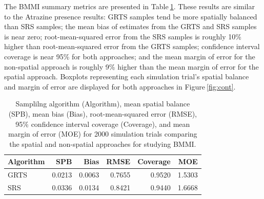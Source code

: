 \documentclass[
  shortnames]{jss}
\begin{document}
The BMMI summary metrics are presented in Table\(~\)\ref{tab:bmmi_sim}.
These results are similar to the Atrazine presence results: GRTS samples
tend be more spatially balanced than SRS samples; the mean bias of
estimates from the GRTS and SRS samples is near zero; root-mean-squared
error from the SRS samples is roughly 10\% higher than root-mean-squared
error from the GRTS samples; confidence interval coverage is near 95\%
for both approaches; and the mean margin of error for the non-spatial
approach is roughly 9\% higher than the mean margin of error for the
spatial approach. Boxplots representing each simulation trial's spatial
balance and margin of error are displayed for both approaches in
Figure\(~\)\ref{fig:cont}.

\begin{table}[t!]
\centering
\begin{tabular}{lrrrrr}
  \hline
Algorithm & SPB & Bias & RMSE & Coverage & MOE \\ 
  \hline
GRTS & 0.0213 & 0.0063 & 0.7655 & 0.9520 & 1.5303 \\ 
  SRS & 0.0336 & 0.0134 & 0.8421 & 0.9440 & 1.6668 \\ 
   \hline
\end{tabular}
\caption{Samplilng algorithm (Algorithm), mean spatial balance (SPB), mean bias (Bias), root-mean-squared error (RMSE), 95\% confidence interval coverage (Coverage), and mean margin of error (MOE) for 2000 simulation trials comparing the spatial and non-spatial approaches for studying BMMI.} 
\label{tab:bmmi_sim}
\end{table}
\end{document}
